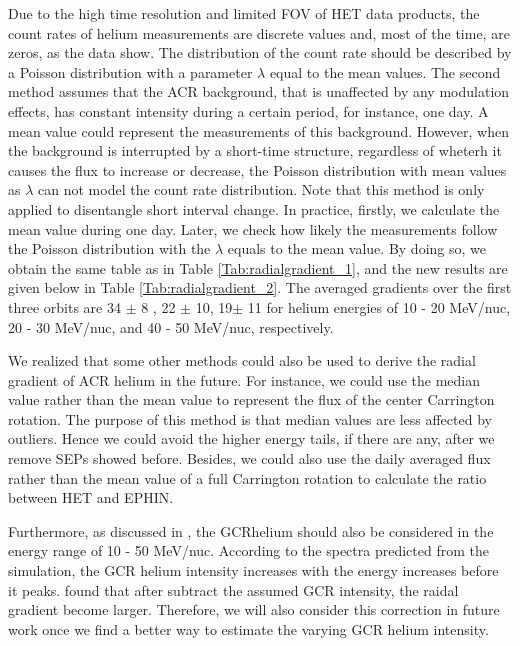 Due to the high time resolution and limited \ac{FOV} of \ac{HET} data products, the count rates of helium measurements are discrete values and, most of the time, are zeros, as the data show. The distribution of the count rate should be described by a Poisson distribution with a parameter $\lambda$ equal to the mean values. 
The second method assumes that the \ac{ACR} background, that is unaffected by any modulation effects, has constant intensity during a certain period, for instance, one day. A mean value could represent the measurements of this background. However, when the background is interrupted by a short-time structure, regardless of wheterh it causes the flux to increase or decrease, the Poisson distribution with mean values as $\lambda$ can not model the count rate distribution. Note that this method is only applied to disentangle short interval change. 
In practice, firstly, we calculate the mean value during one day. Later, we check how likely the measurements follow the Poisson distribution with the $\lambda$ equals to the mean value.
By doing so, we obtain the same table as in Table \ref{Tab:radialgradient_1}, and the new results are given below in Table \ref{Tab:radialgradient_2}.
The averaged gradients over the first three orbits are 34 $\pm$ 8 , 22 $\pm$ 10, 19$\pm$ 11 for helium energies of 10 - 20 MeV/nuc, 20 - 30 MeV/nuc, and 40 - 50 MeV/nuc, respectively. 


We realized that some other methods could also be used to derive the radial gradient of \ac{ACR} helium in the future. For instance, we could use the median value rather than the mean value to represent the flux of the center Carrington rotation. The purpose of this method is that median values are less affected by outliers. Hence we could avoid the higher energy tails, if there are any, after we remove \acp{SEP} showed before. Besides, we could also use the daily averaged flux rather than the mean value of a full Carrington rotation to calculate the ratio between \ac{HET} and \ac{EPHIN}. 


Furthermore, as discussed in \citet{Rankin2021ApJ}, the \ac{GCR}helium should also be considered in the energy range of 10 - 50 MeV/nuc. According to the spectra predicted from the simulation, the \ac{GCR} helium intensity increases with the energy increases before it peaks. \citet{Rankin2021ApJ} found that after subtract the assumed \ac{GCR} intensity, the raidal gradient become larger. Therefore, we will also consider this correction in future work once we find a better way to estimate the varying \ac{GCR} helium intensity.

